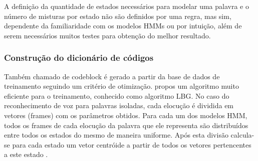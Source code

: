 A definição da quantidade de estados necessários para modelar uma palavra e o número de misturas por estado não são definidos por uma regra, mas sim, dependente da familiaridade com os modelos HMMs ou por intuição, além de serem necessários muitos testes para obtenção do melhor resultado. 

\subsubsection{Construção do dicionário de códigos}
Também chamado de codeblock  é gerado a partir da base de dados de treinamento seguindo um critério de otimização.  propos um algoritmo muito eficiente para o treinamento, conhecido como algoritmo LBG. No caso do reconhecimento de voz para palavras isoladas, cada elocução é dividida em vetores (frames) com os parâmetros obtidos. Para cada um dos modelos HMM, todos os frames de cada elocução da palavra que ele
representa são distribuídos entre todos os estados do mesmo de maneira uniforme. Após esta divisão calcula-se para cada estado um vetor centróide a partir de todos os vetores pertencentes a este estado \cite{RavIsolAnderson}.



 





